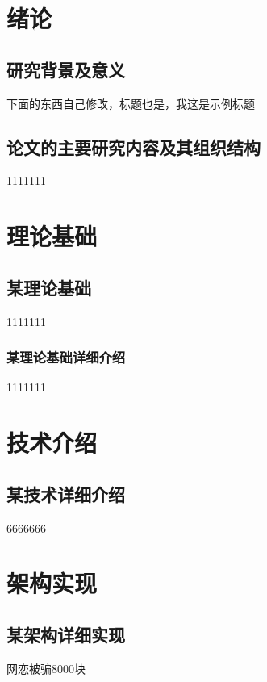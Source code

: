 \documentclass[UTF8,a4paper,12pt]{ctexart}
\begin{document}
	\section{\fontsize{16pt}{\baselineskip}\heiti 绪论}
	\subsection{\fontsize{14pt}{\baselineskip}\heiti 研究背景及意义}
	下面的东西自己修改，标题也是，我这是示例标题
	
	\subsection{\fontsize{14pt}{\baselineskip}\heiti 论文的主要研究内容及其组织结构}
	1111111
	
	\section{\fontsize{16pt}{\baselineskip}\heiti 理论基础}
	
	\subsection{\fontsize{14pt}{\baselineskip}\heiti 某理论基础}
	1111111
	
	\subsubsection{\fontsize{13pt}{\baselineskip}\heiti 某理论基础详细介绍}
	1111111
	

	\section{\fontsize{16pt}{\baselineskip}\heiti 技术介绍}
	\subsection{\fontsize{14pt}{\baselineskip}\heiti 某技术详细介绍}
	6666666
	
	\section{\fontsize{16pt}{\baselineskip}\heiti 架构实现}
	\subsection{\fontsize{14pt}{\baselineskip}\heiti 某架构详细实现}
	网恋被骗8000块
\end{document}
